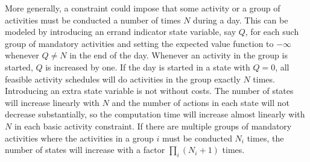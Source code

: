 More generally, a constraint could impose that some activity or a group of activities must be conducted a number of times $N$ during a day. This can be modeled by introducing an errand indicator state variable, say $Q$, for each such group of mandatory activities and setting the expected value function to $-\infty$ whenever $Q\neq N$ in the end of the day. Whenever an activity in the group is started, $Q$ is increased by one. If the day is started in a state with $Q=0$, all feasible activity schedules will do activities in the group exactly $N$ times. Introducing an extra state variable is not without costs. The number of states will increase linearly with $N$ and the number of actions in each state will not decrease substantially, so the computation time will increase almost linearly with $N$ in each basic activity constraint. If there are multiple groups of mandatory activities where the activities in a group $i$ must be conducted $N_i$ times, the number of states will increase with a factor $\prod_i (N_i+1)$ times. 